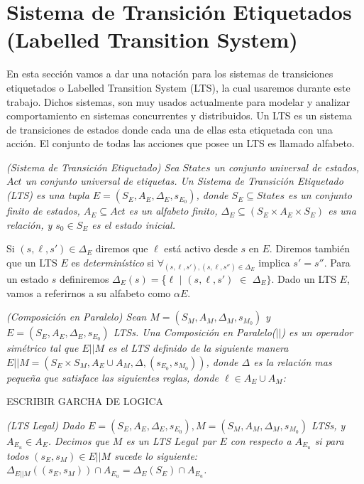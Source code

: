 \section{Sistema de Transición Etiquetados (Labelled Transition System)}

En esta sección vamos a dar una notación para los sistemas de transiciones etiquetados o Labelled Transition System
(LTS), la cual usaremos durante este trabajo. Dichos sistemas, son muy usados actualmente para modelar y analizar
comportamiento en sistemas concurrentes y distribuidos. Un LTS es un sistema de transiciones de estados donde cada una
de ellas esta etiquetada con una acción. El conjunto de todas las acciones que posee un LTS es llamado alfabeto.

\begin{nahaDef}
    \emph{(Sistema de Transición Etiquetado)\cite{Keller:1976:FVP:360248.360251} Sea $States$ un conjunto universal de estados, $Act$ un conjunto
    universal de etiquetas. Un Sistema de Transición Etiquetado (LTS) es una tupla $E = (S_E,A_E,\Delta_E,s_{E_0})$,
    donde $S_E \subseteq States$ es un conjunto finito de estados, $A_E \subseteq Act$ es un alfabeto finito, $\Delta_E
    \subseteq (S_E \times A_E \times S_E)$ es una relación, y $s_0 \in S_E$ es el estado inicial.}
\end{nahaDef}

Si $(s,\ell,s') \in \Delta_E$ diremos que $\ell$ está activo desde $s$ en $E$. Diremos también que un LTS $E$ es
\emph{determinístico} si $\forall_{(s,\ell,s'),(s,\ell,s'') \in \Delta_E}$ implica $s' = s''$. Para un estado $s$ definiremos
$\Delta_E(s) = $\{$\ell$ $|$ $(s,\ell,s')$ $\in$ $\Delta_E\}$. Dado un LTS $E$, vamos a referirnos a su alfabeto como $\alpha E$.

\begin{nahaDef}
    \emph{(Composición en Paralelo) Sean $M = (S_M,A_M,\Delta_M, s_{M_0})$ y $E = (S_E,A_E,\Delta_E, s_{E_0})$ LTSs.
    Una Composición en Paralelo($||$) es un operador simétrico tal que $E||M$ es el LTS definido de la siguiente
    manera $E||M = (S_E \times S_M, A_E \cup A_M, \Delta, (s_{E_0},s_{M_0}))$, donde $\Delta$ es la relación mas
    pequeña que satisface las siguientes reglas, donde $\ell \in A_E \cup A_M$:}
    \label{COMP_EN_PARALELO}
\end{nahaDef}

ESCRIBIR GARCHA DE LOGICA

\begin{nahaDef}
    \emph{(LTS Legal) Dado $E = (S_E, A_E, \Delta_E, s_{E_0}), M = (S_M, A_M, \Delta_M, s_{M_0})$ LTSs, y $A_{E_u} \in
    A_E$. Decimos que $M$ es un LTS $Legal$ par $E$ con respecto a $A_{E_u}$ si para todos $(s_E,s_M) \in E||M$ sucede
    lo siguiente: $\Delta_{E||M}((s_E,s_M)) \cap A_{E_u} = \Delta_E(S_E) \cap A_{E_u}$.}
\end{nahaDef} 

